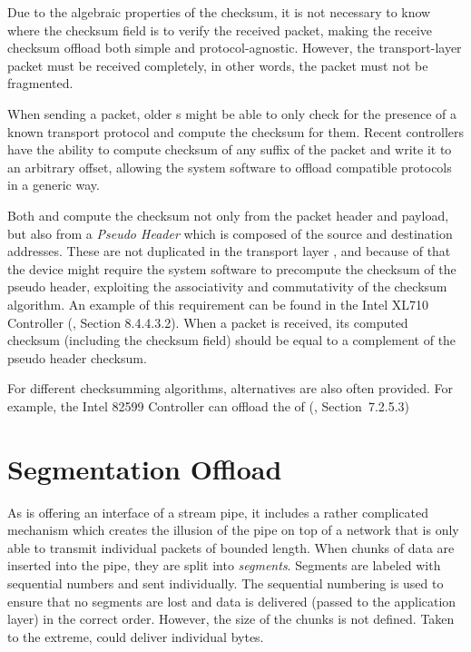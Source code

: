Due to the algebraic properties of the checksum, it is not necessary to know
where the checksum field is to verify the received packet, making the receive
checksum offload both simple and protocol-agnostic. However, the
transport-layer packet must be received completely, in other words, the 
packet must not be fragmented.

When sending a packet, older s might be able to only check for
the presence of a known transport protocol and compute the checksum for them.
Recent controllers have the ability to compute checksum of any suffix of the
packet and write it to an arbitrary offset, allowing the system software to
offload compatible protocols in a generic way.

Both  and  compute the checksum not only from the packet header
and payload, but also from a \emph{Pseudo Header} which is composed of the source and
destination addresses.
These are not duplicated in the transport layer , and because of that
the device might require the system software to precompute the checksum of the pseudo
header, exploiting the associativity and commutativity of the checksum
algorithm. An example of this requirement can be found in the Intel XL710
Controller (\cite{XL710}, Section 8.4.4.3.2). When a packet is received, its
computed checksum (including the checksum field) should be equal to
a complement of the pseudo header checksum.

For different checksumming algorithms, alternatives are also often provided.
For example, the Intel 82599 Controller can offload the  of 
(\cite{82599}, Section~7.2.5.3)

\section{ Segmentation Offload}

As  is offering an interface of a stream pipe, it includes a rather
complicated mechanism which creates the illusion of the pipe on top of a network that is only able to
transmit individual packets of bounded length.
When chunks of data are inserted into the pipe, they are split into \emph{segments}.
Segments are labeled with sequential numbers and sent individually. The
sequential numbering is used to ensure that no segments are lost and data is
delivered (passed to the application layer) in the correct order.
However, the size of the chunks is not defined. Taken to the extreme, 
could deliver individual bytes.

